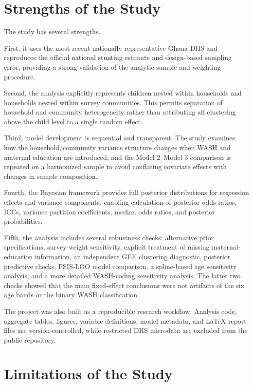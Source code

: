\section{Strengths of the Study}

The study has several strengths.

First, it uses the most recent nationally representative Ghana DHS and reproduces the official national stunting estimate and design-based sampling error, providing a strong validation of the analytic sample and weighting procedure.

Second, the analysis explicitly represents children nested within households and households nested within survey communities. This permits separation of household and community heterogeneity rather than attributing all clustering above the child level to a single random effect.

Third, model development is sequential and transparent. The study examines how the household/community variance structure changes when WASH and maternal education are introduced, and the Model 2--Model 3 comparison is repeated on a harmonized sample to avoid conflating covariate effects with changes in sample composition.

Fourth, the Bayesian framework provides full posterior distributions for regression effects and variance components, enabling calculation of posterior odds ratios, ICCs, variance partition coefficients, median odds ratios, and posterior probabilities.

Fifth, the analysis includes several robustness checks: alternative prior specifications, survey-weight sensitivity, explicit treatment of missing maternal-education information, an independent GEE clustering diagnostic, posterior predictive checks, PSIS-LOO model comparison, a spline-based age sensitivity analysis, and a more detailed WASH-coding sensitivity analysis. The latter two checks showed that the main fixed-effect conclusions were not artifacts of the six age bands or the binary WASH classification.

The project was also built as a reproducible research workflow. Analysis code, aggregate tables, figures, variable definitions, model metadata, and LaTeX report files are version-controlled, while restricted DHS microdata are excluded from the public repository.

\section{Limitations of the Study}

